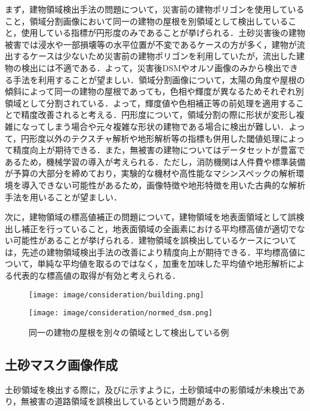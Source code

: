       まず，建物領域検出手法の問題について，災害前の建物ポリゴンを使用していること，領域分割画像において同一の建物の屋根を別領域として検出していること，使用している指標が円形度のみであることが挙げられる．土砂災害後の建物被害では浸水や一部損壊等の水平位置が不変であるケースの方が多く，建物が流出するケースは少ないため災害前の建物ポリゴンを利用していたが，流出した建物の検出には不適である．よって，災害後DSMやオルソ画像のみから検出できる手法を利用することが望ましい．領域分割画像について，太陽の角度や屋根の傾斜によって同一の建物の屋根であっても，色相や輝度が異なるためそれぞれ別領域として分割されている．よって，輝度値や色相補正等の前処理を適用することで精度改善されると考える．円形度について，領域分割の際に形状が変形し複雑になってしまう場合や元々複雑な形状の建物である場合に検出が難しい．よって，円形度以外のテクスチャ解析や地形解析等の指標も併用した閾値処理によって精度向上が期待できる．また，無被害の建物についてはデータセットが豊富であるため，機械学習の導入が考えられる．ただし，消防機関は人件費や標準装備が予算の大部分を締めており，実験的な機材や高性能なマシンスペックの解析環境を導入できない可能性があるため，画像特徴や地形特徴を用いた古典的な解析手法を用いることが望ましい\cite{消防白書}．

      次に，建物領域の標高値補正の問題について，建物領域を地表面領域として誤検出し補正を行っていること，地表面領域の全画素における平均標高値が適切でない可能性があることが挙げられる．建物領域を誤検出しているケースについては，先述の建物領域検出手法の改善により精度向上が期待できる．平均標高値について，単純な平均値を取るのではなく，加重を加味した平均値や地形解析による代表的な標高値の取得が有効と考えられる．

      \begin{figure}[t]
        \begin{minipage}[c]{0.45\hsize}
          \centering
          \texttt{[image: image/consideration/building.png]}
        \end{minipage}
        \begin{minipage}[c]{0.45\hsize}
          \centering
          \texttt{[image: image/consideration/normed\_dsm.png]}
        \end{minipage}
        \caption{同一の建物の屋根を別々の領域として検出している例}
        \label{建物領域低精度例}
      \end{figure}      


    \subsection*{土砂マスク画像作成}
      土砂領域を検出する際に，及びに示すように，土砂領域中の影領域が未検出であり，無被害の道路領域を誤検出しているという問題がある．

